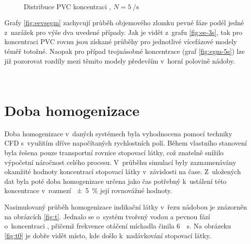 \begin{figure}[h!]
 \centering
  \qquad 
  \\
  \caption{Distribuce PVC koncentraci , $N=\SI{5}{\per\second}$}
  \label{fig:w15}
\end{figure}


Grafy \ref{fig:eevsegm} zachycují průběh objemového zlomku pevné fáze podél jedné z~narážek pro výše dva uvedené případy. Jak je vidět z~grafu \ref{fig:ee-3s}, tak pro koncentraci PVC rovnu  jsou získané průběhy pro jednotlivé vícefázové modely téměř totožné. Naopak pro případ trojnásobné koncentrace (graf \ref{fig:egm-5s}) lze již pozorovat rozdíly mezi těmito modely především v~horní polovině nádoby. 


\begin{grf}[h!]
 \centering
  \\ 
  \caption{Průběh objemového zlomku pevné fáze, \pvpS}
  \label{fig:eevsegm}
\end{grf}
\newpage

\section{Doba homogenizace}
Doba homogenizace v~daných systémech byla vyhodnocena pomocí techniky CFD s~využitím dříve napočítaných rychlostních polí. Během vlastního stanovení byla řešena pouze transportní rovnice stopovací látky, což znatelně snížilo výpočetní náročnost celého procesu. V~průběhu simulací byly zaznamenávány okamžité hodnoty koncentrací stopovací látky v~závislosti na čase. Z~uložených dat byla poté doba homogenizace určena jako čas potřebný k~ustálení této koncentrace v~rozmezí \SI{\pm 5}{\percent} její rovnovážné hodnoty.

Nasimulovaný průběh homogenizace indikační látky v~řezu nádobou je znázorněn na obrázcích \ref{fig:t}. Jednalo se o~systém tvořený vodou a pevnou fází o~koncentraci , přičemž frekvence otáčení míchadla činila \SI{6}{\per\second}. Na obrázeku \ref{fig:t0} je dobře vidět místo, kde došlo k~nadávkování stopovací látky.

